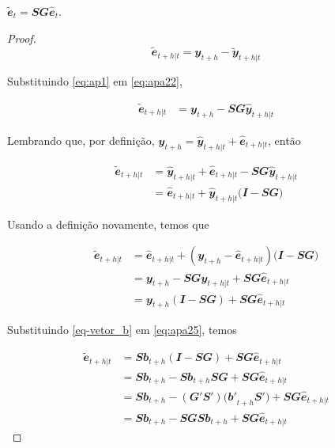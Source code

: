 \begin{apendicesenv}
\begin{proposition}
  $\mathbfit{\tilde{e}}_t = \mathbfit{SG\hat{e}}_t$.

\end{proposition}

\begin{proof}
  \begin{equation} \label{eq:apa22}
    \mathbfit{\tilde{e}}_{t+h|t} = \mathbfit{y}_{t+h} - \mathbfit{\tilde{y}}_{t +h|t}
  \end{equation}

  Substituindo \eqref{eq:ap1} em \eqref{eq:apa22},

  \begin{align} \label{eq:apa23}
    \mathbfit{\tilde{e}}_{t+h|t} &= \mathbfit{y}_{t+h} - \mathbfit{SG\hat{y}}_{t+h|t}
  \end{align}

  Lembrando que, por definição, $\mathbfit{y}_{t+h} = \mathbfit{\hat{y}}_{t+h|t} + \mathbfit{\hat{e}}_{t+h|t}$, então

  \begin{align} \label{eq:apa24}
    \mathbfit{\tilde{e}}_{t+h|t} &= \mathbfit{\hat{y}}_{t+h|t} + \mathbfit{\hat {e}}_{t+h|t} - \mathbfit{SG\hat{y}}_{t+h|t} \\
    &= \mathbfit{\hat{e}}_{t+h|t} + \mathbfit{\hat{y}}_{t+h|t}(\mathbfit{I-SG)}
  \end{align}

  Usando a definição novamente, temos que

  \begin{align}
    \mathbfit{\tilde{e}}_{t+h|t} &= \mathbfit{\hat{e}}_{t+h|t} + (\mathbfit{y}_ {t+h} - \mathbfit{\hat{e}}_{t+h|t})(\mathbfit{I-SG)} \\
    &= \mathbfit{y}_{t+h} - \mathbfit{SGy}_{t+h|t} + \mathbfit{SG\hat{e}}_{t+h| t} \\
    &=  \mathbfit{y}_{t+h}(\mathbfit{I-SG}) + \mathbfit{SG\hat{e}}_{t+h|t}  \label{eq:apa25}
  \end{align}

  Substituindo \eqref{eq-vetor_b} em \eqref{eq:apa25}, temos

  \begin{align}
    \mathbfit{\tilde{e}}_{t+h|t} &=  \mathbfit{Sb}_{t+h}(\mathbfit{I-SG}) +  \mathbfit{SG\hat{e}}_{t+h|t} \\
    &=  \mathbfit{Sb}_{t+h} - \mathbfit{Sb}_{t+h}\mathbfit{SG} + \mathbfit {SG\hat{e}}_{t+h|t}  \\
    &=  \mathbfit{Sb}_{t+h} - \mathbfit{(G'S')(b'}_{t+h}\mathbfit{S')} +   \mathbfit{SG\hat{e}}_{t+h|t}  \\
    &=  \mathbfit{Sb}_{t+h} - \mathbfit{SG}\mathbfit{Sb}_{t+h} + \mathbfit {SG\hat{e}}_{t+h|t}
  \end{align}


\end{proof}
\end{apendicesenv}
